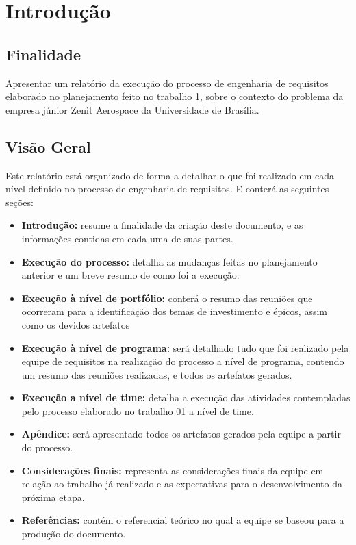 \chapter[Introdução]{Introdução}

\section{Finalidade}
Apresentar um relatório da execução do processo de engenharia de requisitos elaborado no planejamento feito no trabalho 1, sobre o contexto do problema da empresa júnior Zenit Aerospace da Universidade de Brasília.

\section{Visão Geral}
Este relatório está organizado de forma a detalhar o que foi realizado em cada nível definido no processo de engenharia de requisitos. E conterá as seguintes seções:
\begin{itemize}
\item \textbf{Introdução:} 
resume a finalidade da criação deste documento, e as informações contidas em cada uma de suas partes.
\item \textbf{Execução do processo:}
detalha as mudanças feitas no planejamento anterior e um breve resumo de como foi a execução.
\item \textbf{Execução à nível de portfólio:} 
conterá o resumo das reuniões que ocorreram para a identificação dos temas de investimento e épicos, assim como os devidos artefatos
\item \textbf{Execução à nível de programa:} 
será detalhado tudo que foi realizado pela equipe de requisitos na realização do processo a nível de programa, contendo um resumo das reuniões realizadas, e todos os artefatos gerados.
\item \textbf{Execução a nível de time:} 
detalha a execução das atividades contempladas pelo processo elaborado no trabalho 01 a nível de time.
\item \textbf{Apêndice:}
será apresentado todos os artefatos gerados pela equipe a partir do processo.
\item \textbf{Considerações finais:} 
representa as considerações finais da equipe em relação ao trabalho já realizado e as expectativas para o desenvolvimento da próxima etapa.
\item \textbf{Referências:} 
contém o referencial teórico no qual a equipe se baseou para a produção do documento.
\end{itemize}

